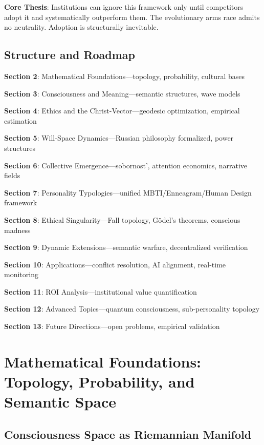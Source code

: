 \documentclass[11pt,a4paper]{article}
\theoremstyle{definition}
\theoremstyle{remark}
\begin{document}
\begin{mdframed}[backgroundcolor=red!5,linewidth=2pt]
\textbf{Core Thesis}: Institutions can ignore this framework only until competitors adopt it and systematically outperform them. The evolutionary arms race admits no neutrality. Adoption is structurally inevitable.
\end{mdframed}

\subsection{Structure and Roadmap}

\textbf{Section 2}: Mathematical Foundations—topology, probability, cultural bases

\textbf{Section 3}: Consciousness and Meaning—semantic structures, wave models

\textbf{Section 4}: Ethics and the Christ-Vector—geodesic optimization, empirical estimation

\textbf{Section 5}: Will-Space Dynamics—Russian philosophy formalized, power structures

\textbf{Section 6}: Collective Emergence—sobornost', attention economics, narrative fields

\textbf{Section 7}: Personality Typologies—unified MBTI/Enneagram/Human Design framework

\textbf{Section 8}: Ethical Singularity—Fall topology, Gödel's theorems, conscious madness

\textbf{Section 9}: Dynamic Extensions—semantic warfare, decentralized verification

\textbf{Section 10}: Applications—conflict resolution, AI alignment, real-time monitoring

\textbf{Section 11}: ROI Analysis—institutional value quantification

\textbf{Section 12}: Advanced Topics—quantum consciousness, sub-personality topology

\textbf{Section 13}: Future Directions—open problems, empirical validation

\section{Mathematical Foundations: Topology, Probability, and Semantic Space}

\subsection{Consciousness Space as Riemannian Manifold}
\end{document}
